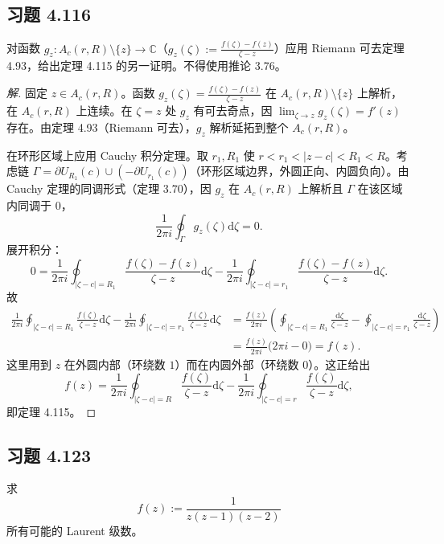 \documentclass[11pt,a4paper]{article}
\newcommand{\C}{\mathbb{C}}
\newcommand{\dd}{\mathrm{d}}
\theoremstyle{definition}
\newenvironment{solution}{\begin{proof}[解]}{\end{proof}}
\begin{document}
\subsection{习题 4.116}

对函数 $g_z : A_c(r, R) \setminus \{z\} \to \C$（$g_z(\zeta) := \frac{f(\zeta) - f(z)}{\zeta - z}$）应用 Riemann 可去定理 4.93，给出定理 4.115 的另一证明。不得使用推论 3.76。

\begin{solution}
  固定 $z \in A_c(r, R)$。函数 $g_z(\zeta) = \frac{f(\zeta)-f(z)}{\zeta-z}$ 在 $A_c(r, R) \setminus \{z\}$ 上解析，在 $A_c(r, R)$ 上连续。在 $\zeta = z$ 处 $g_z$ 有可去奇点，因 $\lim_{\zeta \to z} g_z(\zeta) = f'(z)$ 存在。由定理 4.93（Riemann 可去），$g_z$ 解析延拓到整个 $A_c(r, R)$。

  在环形区域上应用 Cauchy 积分定理。取 $r_1, R_1$ 使 $r < r_1 < |z-c| < R_1 < R$。考虑链 $\Gamma = \partial U_{R_1}(c) \cup (-\partial U_{r_1}(c))$（环形区域边界，外圆正向、内圆负向）。由 Cauchy 定理的同调形式（定理 3.70），因 $g_z$ 在 $A_c(r, R)$ 上解析且 $\Gamma$ 在该区域内同调于 $0$，
  \[
    \frac{1}{2\pi i} \oint_{\Gamma} g_z(\zeta) \dd \zeta = 0.
  \]
  展开积分：
  \[
    0 = \frac{1}{2\pi i} \oint_{|\zeta-c|=R_1} \frac{f(\zeta)-f(z)}{\zeta-z} \dd\zeta
    - \frac{1}{2\pi i} \oint_{|\zeta-c|=r_1} \frac{f(\zeta)-f(z)}{\zeta-z} \dd\zeta.
  \]
  故
  \begin{align*}
    \frac{1}{2\pi i} \oint_{|\zeta-c|=R_1} \frac{f(\zeta)}{\zeta-z} \dd\zeta
    - \frac{1}{2\pi i} \oint_{|\zeta-c|=r_1} \frac{f(\zeta)}{\zeta-z} \dd\zeta
    &= \frac{f(z)}{2\pi i} \left(
      \oint_{|\zeta-c|=R_1} \frac{\dd\zeta}{\zeta-z}
      - \oint_{|\zeta-c|=r_1} \frac{\dd\zeta}{\zeta-z}
    \right)\\
    &= \frac{f(z)}{2\pi i} \bigl(2\pi i - 0\bigr) = f(z).
  \end{align*}
  这里用到 $z$ 在外圆内部（环绕数 $1$）而在内圆外部（环绕数 $0$）。这正给出
  \[
    f(z) = \frac{1}{2\pi i} \oint_{|\zeta-c|=R} \frac{f(\zeta)}{\zeta-z} \dd\zeta
    - \frac{1}{2\pi i} \oint_{|\zeta-c|=r} \frac{f(\zeta)}{\zeta-z} \dd\zeta,
  \]
  即定理 4.115。
\end{solution}

\subsection{习题 4.123}

求
\[
  f(z) := \frac{1}{z(z-1)(z-2)}
\]
所有可能的 Laurent 级数。
\end{document}

